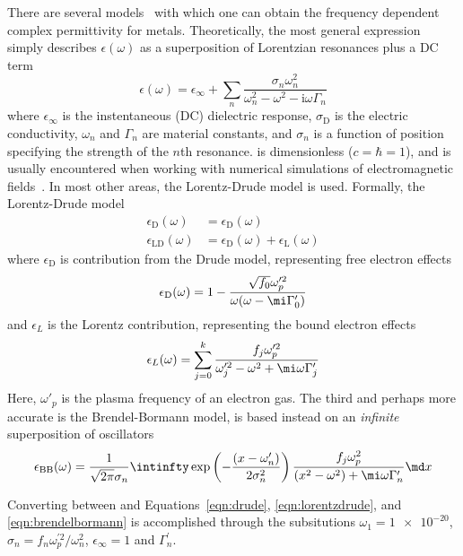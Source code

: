 There are several models~\cite{rakic1998optical} with which one
can obtain the frequency dependent complex permittivity for metals.
Theoretically, the most general expression simply describes
$\epsilon(\omega)$ as a superposition of Lorentzian resonances plus a DC
term
\begin{equation}
\epsilon(\omega)= \epsilon_\infty+\sum_n \frac{\sigma_n \omega_n^2} {\omega_n^2-\omega^2-{\mathrm{i}}\omega\Gamma_n}
\label{eqn:meepdispersion}
\end{equation}
where $\epsilon_\infty$ is the instentaneous (DC) dielectric response,
$\sigma_\mathrm{D}$ is the electric conductivity, $\omega_n$ and $\Gamma_n$ are
material constants, and $\sigma_n$ is a function of position specifying the
strength of the $n$th resonance.   is
dimensionless ($c=\hbar=1$), and is usually encountered when working with
numerical simulations of electromagnetic fields~\cite{oskooi2010meep}.
In most other areas, the Lorentz-Drude model is used.  Formally, the Lorentz-Drude model
\begin{align}
\epsilon_\mathrm{D}(\omega)&=\epsilon_\mathrm{D}(\omega)\\
\epsilon_\mathrm{LD}(\omega)&=\epsilon_\mathrm{D}(\omega)+\epsilon_\mathrm{L}(\omega)
\end{align}
where $\epsilon_\mathrm{D}$ is contribution from the Drude model, representing
free electron effects
\begin{align}
\epsilon_\mathrm{D}(\omega)=1-\frac{\sqrt{f_0} \omega_p^{\prime 2}}{\omega(\omega -
\mi\Gamma_0^\prime)}
\label{eqn:drude}
\end{align}
and $\epsilon_L$ is the Lorentz contribution, representing the bound
electron effects
\begin{align}
\epsilon_L(\omega) =\sum_{j=0}^{k}\frac{f_j\omega_p^{\prime 2}}{\omega_j^{\prime
2}-\omega^2+\mi\omega\Gamma_j^\prime}
\label{eqn:lorentzdrude}
\end{align}
Here, $\omega'_p$ is the plasma frequency of an electron gas.
The third and perhaps more accurate is the Brendel-Bormann model, is based instead on an
\textit{infinite} superposition of oscillators
\begin{align}
\epsilon_\text{BB}(\omega) = \frac{1}{\sqrt{2 \pi} \sigma_n} \intinfty
\exp\left(-\frac{(x-\omega'_n)}{2 \sigma_n^2}\right)
\frac{f_j \omega_p^2}{(x^2-\omega^2)+\mi \omega \Gamma'_n} \md x
\label{eqn:brendelbormann}
\end{align}

Converting between  and
Equations~\ref{eqn:drude}, \ref{eqn:lorentzdrude}, and
\ref{eqn:brendelbormann} is accomplished through the subsitutions $\omega_1
= \num{1e-20}$, $\sigma_n = {f_n \omega_p^{\prime 2}}/{\omega_n^2}$,
$\epsilon_\infty=1$ and $\Gamma_n^\prime$.

